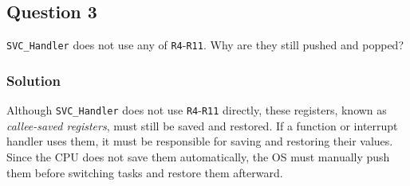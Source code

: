 \subsection*{Question 3}

\texttt{SVC\_Handler} does not use any of \texttt{R4}-\texttt{R11}.
Why are they still pushed and popped?

\subsubsection*{Solution}

Although \texttt{SVC\_Handler} does not use \texttt{R4}-\texttt{R11} directly, these registers, known as \textit{callee-saved registers}, must still be saved and restored.
If a function or interrupt handler uses them, it must be responsible for saving and restoring their values.
Since the CPU does not save them automatically, the OS must manually push them before switching tasks and restore them afterward.
